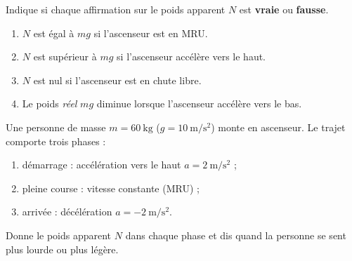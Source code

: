 \documentclass[11pt,a4paper]{article}
\begin{document}
\begin{exo}
Indique si chaque affirmation sur le poids apparent $N$ est \textbf{vraie} ou
\textbf{fausse}.
\begin{enumerate}[label=\alph*)]
  \item $N$ est égal à $mg$ si l'ascenseur est en MRU.
  \item $N$ est supérieur à $mg$ si l'ascenseur accélère vers le haut.
  \item $N$ est nul si l'ascenseur est en chute libre.
  \item Le poids \emph{réel} $mg$ diminue lorsque l'ascenseur accélère vers le bas.
\end{enumerate}
\end{exo}

\begin{exo}
Une personne de masse $m=\qty{60}{\kilogram}$ ($g=\qty{10}{\metre\per\second\squared}$)
monte en ascenseur. Le trajet comporte trois phases :
\begin{enumerate}[label=\alph*)]
  \item démarrage : accélération vers le haut $a=\qty{2}{\metre\per\second\squared}$ ;
  \item pleine course : vitesse constante (MRU) ;
  \item arrivée : décélération $a=-\qty{2}{\metre\per\second\squared}$.
\end{enumerate}
Donne le poids apparent $N$ dans chaque phase et dis quand la personne se sent plus
lourde ou plus légère.
\end{exo}
\end{document}
